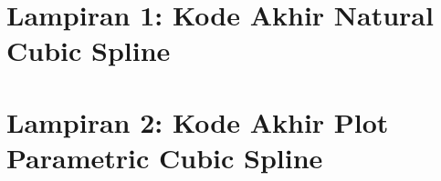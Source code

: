 \chapter*{Lampiran 1: Kode Akhir Natural Cubic Spline}
\label{appendix:naturalCubicSpline}


\chapter*{Lampiran 2: Kode Akhir Plot Parametric Cubic Spline}
\label{appendix:naturalCubicSpline}

